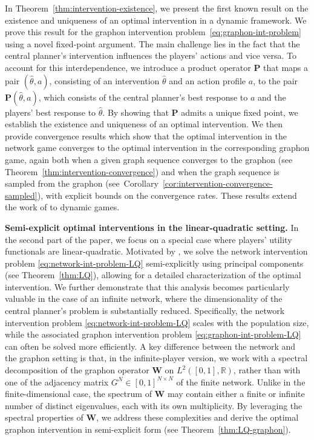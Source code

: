 \documentclass[11pt]{article}
\numberwithin{equation}{section}
\begin{document}
In Theorem~\ref{thm:intervention-existence}, we present the first known result on the existence and uniqueness of an optimal intervention in a dynamic framework. We prove this result for the graphon intervention problem~\eqref{eq:graphon-int-problem} using a novel fixed-point argument. The main challenge lies in the fact that the central planner’s intervention influences the players’ actions and vice versa. To account for this interdependence, we introduce a product operator $\boldsymbol{P}$ that maps a pair $(\hat\theta, a)$, consisting of an intervention $\hat\theta$ and an action profile $a$, to the pair $\boldsymbol{P}(\hat\theta, a)$, which consists of the central planner’s best response to $a$ and the players’ best response to $\hat\theta$. By showing that $\boldsymbol{P}$ admits a unique fixed point, we establish the existence and uniqueness of an optimal intervention.
We then provide convergence results which show that the optimal intervention in the network game converges to the optimal intervention in the corresponding graphon game, again both when a given graph sequence converges to the graphon (see Theorem~\ref{thm:intervention-convergence}) and when the graph sequence is sampled from the graphon (see~Corollary~\ref{cor:intervention-convergence-sampled}), with explicit bounds on the convergence rates. These results extend the work of \citet{parise2023graphon} to dynamic games.

\textbf{Semi-explicit optimal interventions in the linear-quadratic setting.}
In the second part of the paper, we focus on a special case where players’ utility functionals are linear-quadratic. Motivated by \citet{galeotti2020targeting}, we solve the network intervention problem \eqref{eq:network-int-problem-LQ} semi-explicitly using principal components (see Theorem~\ref{thm:LQ}), allowing for a detailed characterization of the optimal intervention. We further demonstrate that this analysis becomes particularly valuable in the case of an infinite network, where the dimensionality of the central planner’s problem is substantially reduced. Specifically, the network intervention problem \eqref{eq:network-int-problem-LQ} scales with the population size, while the associated graphon intervention problem \eqref{eq:graphon-int-problem-LQ} can often be solved more efficiently. A key difference between the network and the graphon setting is that, in the infinite-player version, we work with a spectral decomposition of the graphon operator $\boldsymbol{W}$ on $L^2([0,1], \mathbb{R})$, rather than with one of the adjacency matrix $G^N\in [0,1]^{N\times N}$ of the finite network. Unlike in the finite-dimensional case, the spectrum of $\boldsymbol{W}$ may contain either a finite or infinite number of distinct eigenvalues, each with its own multiplicity. By leveraging the spectral properties of $\boldsymbol{W}$, we address these complexities and derive the optimal graphon intervention in semi-explicit form (see Theorem~\ref{thm:LQ-graphon}).
\end{document}
